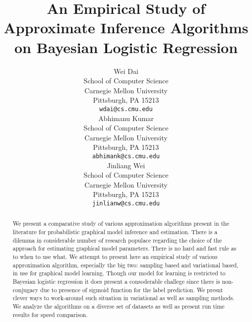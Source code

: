 \documentclass{article}
\title{An Empirical Study of Approximate Inference Algorithms on Bayesian
Logistic Regression}
\author{
Wei Dai \\
School of Computer Science \\
Carnegie Mellon University\\
Pittsburgh, PA 15213\\
\texttt{wdai@cs.cmu.edu}\\
\And
Abhimanu Kumar \\
School of Computer Science \\
Carnegie Mellon University\\
Pittsburgh, PA 15213\\
\texttt{abhimank@cs.cmu.edu}\\
\And
Jinliang Wei \\
School of Computer Science \\
Carnegie Mellon University\\
Pittsburgh, PA 15213\\
\texttt{jinlianw@cs.cmu.edu}\\
}
\begin{document}
\maketitle

\begin{abstract}
We present a comparative study of various approximation algorithms present in
the literature for probabilistic graphical model inference and estimation. There
is a dilemma in considerable number of research populace regarding the choice
of the approach for estimating graphical model parameters. There is no hard and
fast rule as to when to use what. We attempt to present here an empirical study of
various approximation algorithm, especially the big two: sampling based
and variational based, in use for graphical model learning. Though our model for
learning is restricted to Bayesian logistic regression it does present a
consoderable challege since there is non-conjugacy due to presence of sigmoid
function for the label prediction. We presnt clever ways to work-around such
situation in variational as well as sampling methods. We analyze the algorithms
on a diverse set of datasets as well as present run time results for speed
comparison.
\end{abstract}

\setcounter{page}{1}











\end{document}
